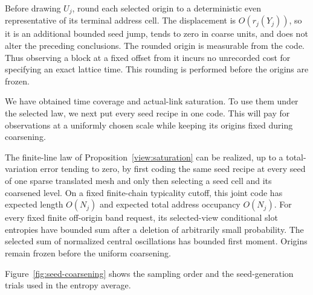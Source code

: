 Before drawing $U_j$, round each selected origin to a deterministic even
representative of its terminal address cell.  The displacement is
$O(r_j(Y_j))$, so it is an additional bounded seed jump, tends to zero in
coarse units, and does not alter the preceding conclusions.  The rounded
origin is measurable from the code.  Thus observing a block at a fixed
offset from it incurs no unrecorded cost for specifying an exact lattice
time.  This rounding is performed before the origins are frozen.

We have obtained time coverage and actual-link saturation.  To use them
under the selected law, we next put every seed recipe in one code.  This
will pay for observations at a uniformly chosen scale while keeping its
origins fixed during coarsening.

\begin{lemma}\label{view:all-seed-code}
The finite-line law of Proposition~\ref{view:saturation} can be realized,
up to a total-variation error tending to zero, by first coding the same
seed recipe at every seed of one sparse translated mesh and only then
selecting a seed cell and its coarsened level.  On a fixed finite-chain
typicality cutoff, this joint code has expected length $O(N_j)$ and
expected total address occupancy $O(N_j)$.  For every fixed finite
off-origin band request, its selected-view conditional slot entropies
have bounded sum after a deletion of arbitrarily small probability.
The selected sum of normalized central oscillations has bounded first
moment.  Origins remain frozen before the uniform coarsening.
\end{lemma}

Figure~\ref{fig:seed-coarsening} shows the sampling order and the
seed-generation trials used in the entropy average.


